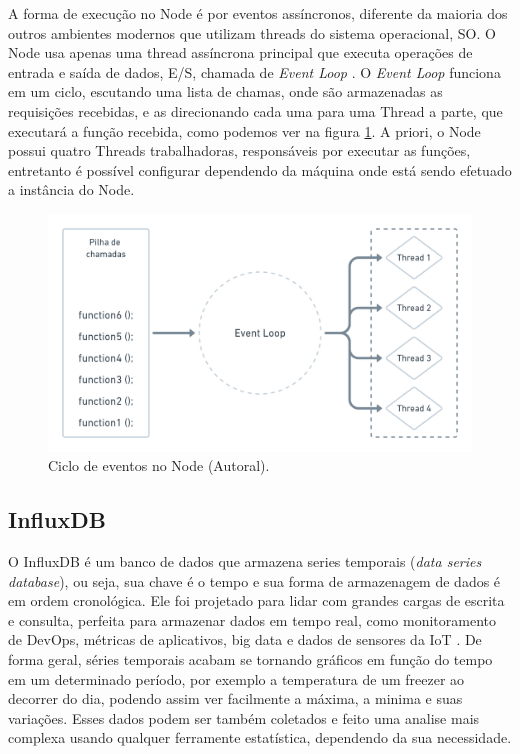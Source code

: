 A forma de execução no Node é por eventos assíncronos, diferente da maioria dos outros ambientes modernos que utilizam threads do sistema operacional, SO. O Node usa apenas uma thread assíncrona principal que executa operações de entrada e saída de dados, E/S, chamada de \textit{Event Loop} \cite{nodejsAbout}. O \textit{Event Loop} funciona em um ciclo, escutando uma lista de chamas, onde são armazenadas as requisições recebidas, e as direcionando cada uma para uma Thread a parte, que executará a função recebida, como podemos ver na figura \ref{fig:event-loop-node}. A priori, o  Node possui quatro Threads trabalhadoras, responsáveis por executar as funções, entretanto é possível configurar dependendo da máquina onde está sendo efetuado a instância do Node.

\begin{figure}[H]
  \centering
  \includegraphics[width=.80\textwidth]{assets/event-loop-node.png} 
  \caption{Ciclo de eventos no Node (Autoral).}
  \label{fig:event-loop-node} 
\end{figure}

\subsection{InfluxDB}
\label{fund:influxdb}
O InfluxDB é um banco de dados que armazena series temporais (\textit{data series database}), ou seja, sua chave é o tempo e sua forma de armazenagem de dados é em ordem cronológica. Ele foi projetado para lidar com grandes cargas de escrita e consulta, perfeita para armazenar dados em tempo real, como monitoramento de DevOps, métricas de aplicativos, big data e dados de sensores da IoT \cite{giacobbe2018implementation}. De forma geral, séries temporais acabam se tornando gráficos em função do tempo em um determinado período, por exemplo a temperatura de um freezer ao decorrer do dia, podendo assim ver facilmente a máxima, a minima e suas variações. Esses dados podem ser também coletados e feito uma analise mais complexa usando qualquer ferramente estatística, dependendo da sua necessidade.

